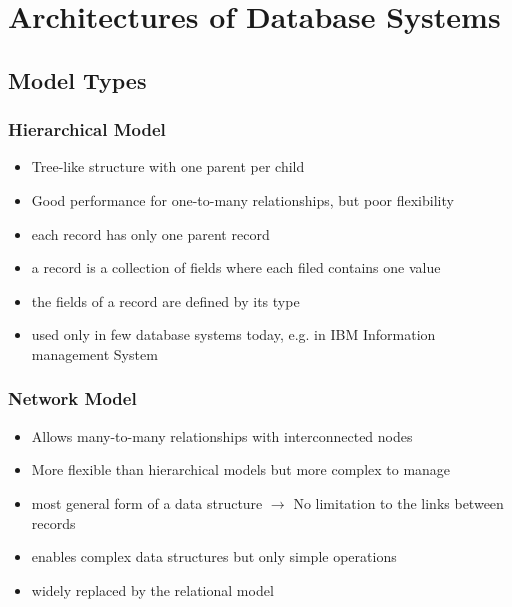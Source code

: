 \chapter{Architectures of Database Systems}

\section{Model Types}

\begin{center}
	
\end{center}

\subsection{Hierarchical Model}
\begin{itemize}
	\item Tree-like structure with one parent per child
	\item Good performance for one-to-many relationships, but poor flexibility
	\item each record has only one parent record
	\item a record is a collection of fields where each filed contains one value
	\item the fields of a record are defined by its type
	\item used only in few database systems today, e.g. in IBM Information management System
\end{itemize}

\subsection{Network Model}
\begin{itemize}
	\item Allows many-to-many relationships with interconnected nodes
	\item More flexible than hierarchical models but more complex to manage
	\item most general form of a data structure $\rightarrow$ No limitation to the links between records
	\item enables complex data structures but only simple operations
	\item widely replaced by the relational model
\end{itemize}

